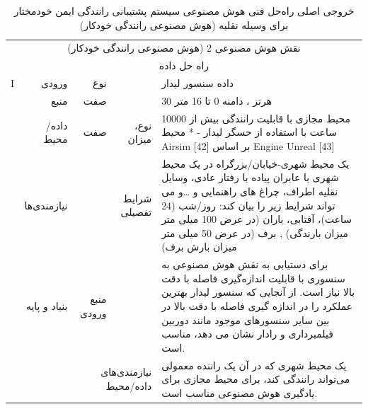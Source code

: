 \documentclass[a4paper,10pt]{article}
\begin{document}
            \begin{table}[htbp]

                \centering
                \caption{خروجی اصلی راه‌حل فنی هوش مصنوعی سیستم پشتیبانی رانندگی ایمن خودمختار برای وسیله نقلیه (هوش مصنوعی رانندگی خودکار)}
                \begin{tabularx}{\textwidth}{c c c c X}

                    \vspace{-10pt}\\

                    \hline

                    \multicolumn{5}{c}{نقش هوش مصنوعی 2 (هوش مصنوعی رانندگی خودکار)}\\
                    
                    \hline

                    \multicolumn{5}{c}{راه حل داده}\\

                    \multicolumn{1}{c}{I} & \multicolumn{1}{r}{ورودی} & \multicolumn{1}{r}{نوع} &  & داده سنسور لیدار \\
                    & \multicolumn{1}{r}{منبع} & \multicolumn{1}{r}{صفت} &  & 30 هرتز ، دامنه 0 تا 16 متر \\
                    & \multicolumn{1}{r}{داده/محیط} & \multicolumn{1}{r}{صفت} & \multicolumn{1}{r}{نوع، میزان} & محیط مجازی با قابلیت رانندگی بیش از 10000 ساعت با استفاده از حسگر لیدار - * محیط Airsim [42] بر اساس Engine Unreal [43] \\
                    & \multicolumn{1}{r}{نیازمندی‌ها} &  & \multicolumn{1}{r}{شرایط تفصیلی} & یک محیط شهری-خیابان/بزرگراه در یک محیط شهری با عابران پیاده با رفتار عادی، وسایل نقلیه اطراف، چراغ های راهنمایی و \dots و می تواند شرایط زیر را بیان کند: روز/شب (24 ساعت)، آفتابی، باران (در عرض 100 میلی متر میزان بارندگی) , برف (در عرض 50 میلی متر میزان بارش برف) \\
                    & \multicolumn{1}{r}{بنیاد و پایه} & \multicolumn{1}{r}{منبع ورودی} &  & برای دستیابی به نقش هوش مصنوعی به سنسوری با قابلیت اندازه‌گیری فاصله با دقت بالا نیاز است. از آنجایی که سنسور لیدار بهترین عملکرد را در اندازه گیری فاصله با دقت بالا در بین سایر سنسورهای موجود مانند دوربین فیلمبرداری و رادار نشان می دهد، مناسب است. \\
                    &  & \multicolumn{2}{r}{نیازمندی‌های داده/محیط} & یک محیط شهری که در آن یک راننده معمولی می‌تواند رانندگی کند، برای محیط مجازی برای یادگیری هوش مصنوعی مناسب است. \\


\end{tabularx}
\end{table}
\end{document}
